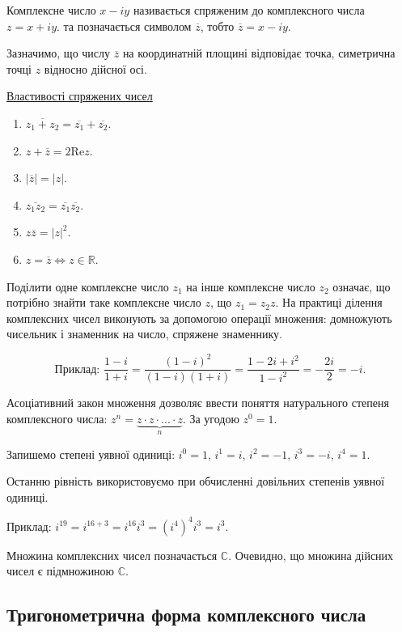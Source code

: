 \begin{definition}
	Комплексне число $x - iy$ називається спряженим до комплексного
	числа $z = x + iy$. та позначається символом $\overline{z}$, тобто $\overline{z} = x - iy$.
\end{definition}

Зазначимо, що числу $\overline{z}$ на координатній площині відповідає точка,
симетрична точці $z$ відносно дійсної осі.

\underline{Властивості спряжених чисел}

\begin{enumerate}
	\item $\overline{z_1+z_2} = \overline{z_1} + \overline{z_2}$.
	\item $z + \overline{z} = 2 \text{Re}z$.
	\item $|\overline{z}| = |z|$.
	\item $\overline{z_1z_2} = \overline{z_1}\overline{z_2}$.
	\item $z\overline{z} = |z|^2$.
	\item $z = \overline{z} \Leftrightarrow z \in \mathbb{R}$.
\end{enumerate}

Поділити одне комплексне число $z_1$ на інше комплексне число $z_2$ означає, що
потрібно знайти таке комплексне число $z$, що $z_1 = z_2z$. На практиці ділення 
комплексних чисел виконують за допомогою операції множення: домножують
чисельник і знаменник на число, спряжене знаменнику.

$$\text{Приклад: }\dfrac{1-i}{1+i} = \dfrac{(1-i)^2}{(1-i)(1+i)} = \dfrac{1 - 2i + i^2}{1-i^2} = -\dfrac{2i}{2} = -i.$$

Асоціативний закон множення дозволяє ввести поняття натурального степеня
комплексного числа: $z^n = \underbrace{z \cdot z \cdot ... \cdot z}\limits_n$. За угодою $z^0 = 1$.

Запишемо степені уявної одиниці: $i^0 = 1$, $i^1 = i$, $i^2 = -1$, $i^3 = -i$, $i^4 = 1$.

Останню рівність використовуємо при обчисленні довільних степенів уявної
одиниці.

Приклад: $i^{19} = i^{16 + 3} = i^{16} i^{3} = (i^4)^4i^3 = i^3$.

Множина комплексних чисел позначається $\mathbb{C}$. Очевидно, що множина
дійсних чисел є підмножиною $\mathbb{C}$.

\subsection{Тригонометрична форма комплексного числа}

